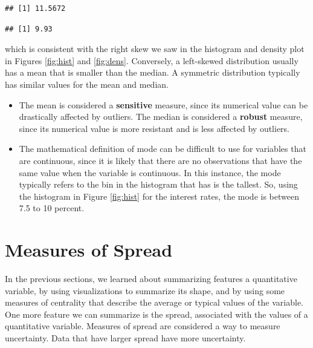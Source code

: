 \documentclass[
]{book}
\newenvironment{Shaded}{\begin{snugshade}}{\end{snugshade}}
\newcommand{\FunctionTok}[1]{\textcolor[rgb]{0.13,0.29,0.53}{\textbf{#1}}}
\newcommand{\NormalTok}[1]{#1}
\newcommand{\SpecialCharTok}[1]{\textcolor[rgb]{0.81,0.36,0.00}{\textbf{#1}}}
\begin{document}
\begin{verbatim}
## [1] 11.5672
\end{verbatim}

\begin{Shaded}
\end{Shaded}

\begin{verbatim}
## [1] 9.93
\end{verbatim}

which is consistent with the right skew we saw in the histogram and density plot in Figures \ref{fig:hist} and \ref{fig:dens}. Conversely, a left-skewed distribution usually has a mean that is smaller than the median. A symmetric distribution typically has similar values for the mean and median.

\begin{itemize}
\item
  The mean is considered a \textbf{sensitive} measure, since its numerical value can be drastically affected by outliers. The median is considered a \textbf{robust} measure, since its numerical value is more resistant and is less affected by outliers.
\item
  The mathematical definition of mode can be difficult to use for variables that are continuous, since it is likely that there are no observations that have the same value when the variable is continuous. In this instance, the mode typically refers to the bin in the histogram that has is the tallest. So, using the histogram in Figure \ref{fig:hist} for the interest rates, the mode is between 7.5 to 10 percent.
\end{itemize}

\section{Measures of Spread}\label{measures-of-spread}

In the previous sections, we learned about summarizing features a quantitative variable, by using visualizations to summarize its shape, and by using some measures of centrality that describe the average or typical values of the variable. One more feature we can summarize is the spread, associated with the values of a quantitative variable. Measures of spread are considered a way to measure uncertainty. Data that have larger spread have more uncertainty.
\end{document}
